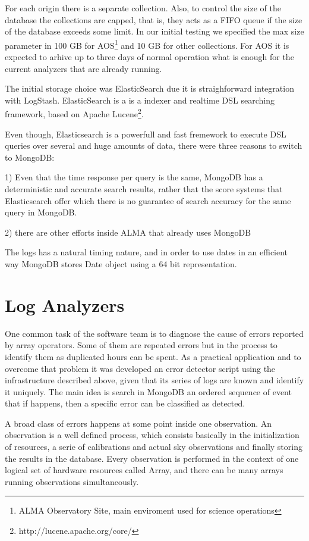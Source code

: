 \documentclass[]{spie}  %
\begin{document}
For each origin there is a separate collection. Also, to control the size of
the database the collections are capped, that is, they acts as a FIFO queue if
the size of the database exceeds some limit. In our initial testing we
specified the max size parameter in 100 GB for AOS\footnote{ALMA Observatory Site, 
main enviroment used for science operations} and 10 GB for other
collections. For AOS it is expected to arhive up to three days of normal operation
what is enough for the current analyzers that are already running.

The initial storage choice was ElasticSearch due it is straighforward
integration with LogStash. ElasticSearch is a is a indexer and realtime DSL searching framework, based on Apache Lucene\footnote{http://lucene.apache.org/core/}.

Even though, Elasticsearch is a powerfull and fast fremework to execute DSL queries
over several and huge amounts of data, there were three reasons to switch to MongoDB:

1) Even that the time response per query is the same, MongoDB has a deterministic and accurate search results, rather that the score systems that Elasticsearch offer which there is no guarantee of search accuracy for the same query in MongoDB.

2) there are other efforts inside ALMA that already uses MongoDB\cite{shenexploring}

The logs has a natural timing nature, and in order to use dates in an efficient
way MongoDB stores Date object using a 64 bit representation.

\section{Log Analyzers}
One common task of the software team is to diagnose the cause of errors
reported by array operators. Some of them are repeated errors but in the
process to identify them as duplicated hours can be spent. As a practical
application and to overcome that problem it was developed an error detector
script using the infrastructure described above, given that its series of logs
are known and identify it uniquely. The main idea is search in MongoDB an
ordered sequence of event that if happens, then a specific error can be
classified as detected.

A broad class of errors happens at some point inside one observation. An
observation is a well defined process, which consists basically in the
initialization of resources, a serie of calibrations and actual sky
observations and finally storing the results in the database. Every observation
is performed in the context of one logical set of hardware resources called
Array, and there can be many arrays running observations simultaneously. 
\end{document}
